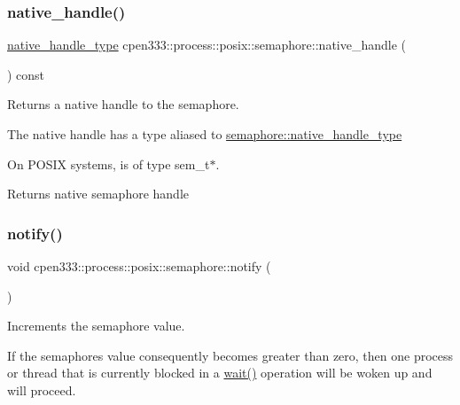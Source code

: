 \subsubsection{\texorpdfstring{native\+\_\+handle()}{native\_handle()}}
{\footnotesize\ttfamily \hyperlink{classcpen333_1_1process_1_1posix_1_1semaphore_ad63150e5c8c196a84a7b214462756f1a}{native\+\_\+handle\+\_\+type} cpen333\+::process\+::posix\+::semaphore\+::native\+\_\+handle (\begin{DoxyParamCaption}{ }\end{DoxyParamCaption}) const\hspace{0.3cm}{\ttfamily [inline]}}



Returns a native handle to the semaphore. 

The native handle has a type aliased to \hyperlink{classcpen333_1_1process_1_1posix_1_1semaphore_ad63150e5c8c196a84a7b214462756f1a}{semaphore\+::native\+\_\+handle\+\_\+type}

On P\+O\+S\+IX systems, is of type sem\+\_\+t$\ast$.

\begin{DoxyReturn}{Returns}
native semaphore handle 
\end{DoxyReturn}
\mbox{\label{classcpen333_1_1process_1_1posix_1_1semaphore_a1b9043106c5da18ad152bc83e3de1750}} 
\subsubsection{\texorpdfstring{notify()}{notify()}}
{\footnotesize\ttfamily void cpen333\+::process\+::posix\+::semaphore\+::notify (\begin{DoxyParamCaption}{ }\end{DoxyParamCaption})\hspace{0.3cm}{\ttfamily [inline]}}



Increments the semaphore value. 

If the semaphore\textquotesingle{}s value consequently becomes greater than zero, then one process or thread that is currently blocked in a \hyperlink{classcpen333_1_1process_1_1posix_1_1semaphore_a1cf2d5f5922ab6358061dd3ac7121cf9}{wait()} operation will be woken up and will proceed. \mbox{\label{classcpen333_1_1process_1_1posix_1_1semaphore_ac0e2bd6495113c0699c5e2511f345edb}} 
